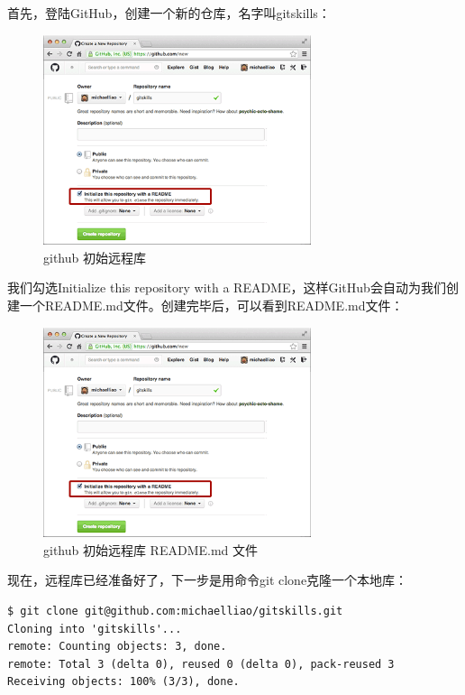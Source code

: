 首先，登陆GitHub，创建一个新的仓库，名字叫gitskills：

\begin{figure}[h]
  \centering
  \includegraphics[width=0.7\textwidth]{img/github-init-repo.png}
  \caption{github 初始远程库}
  \label{fig:mesh1}
\end{figure}

我们勾选Initialize this repository with a README，这样GitHub会自动为我们创建一个README.md文件。创建完毕后，可以看到README.md文件：

\begin{figure}[h]
  \centering
  \includegraphics[width=0.7\textwidth]{img/github-init-repo.png}
  \caption{github 初始远程库 README.md 文件}
  \label{fig:mesh1}
\end{figure}

现在，远程库已经准备好了，下一步是用命令git clone克隆一个本地库：

\begin{verbatim}
$ git clone git@github.com:michaelliao/gitskills.git
Cloning into 'gitskills'...
remote: Counting objects: 3, done.
remote: Total 3 (delta 0), reused 0 (delta 0), pack-reused 3
Receiving objects: 100% (3/3), done.
\end{verbatim}

